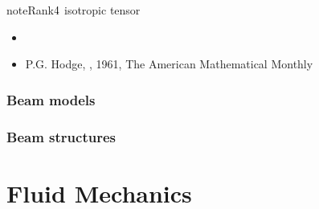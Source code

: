 \documentclass[letterpaper,10pt,english]{jupyterBook}
\begin{document}
\begin{sphinxadmonition}{note}{Rank\sphinxhyphen{}\protect\(4\protect\) isotropic tensor}
\sphinxAtStartPar
{}
\begin{itemize}
\item {} 
\sphinxAtStartPar
{}

\item {} 
\sphinxAtStartPar
P.G. Hodge, , 1961, The American Mathematical Monthly

\end{itemize}
\end{sphinxadmonition}


\section{Beam models}
\label{\detokenize{ch/solids/small-displacements-statics:beam-models}}\label{\detokenize{ch/solids/small-displacements-statics:solid-mechanics-intro-small-displacements-statics-beam}}

\section{Beam structures}
\label{\detokenize{ch/solids/small-displacements-statics:beam-structures}}\label{\detokenize{ch/solids/small-displacements-statics:solid-mechanics-intro-small-displacements-statics-beam-structures}}
\sphinxstepscope


\part{Fluid Mechanics}

\sphinxstepscope
\end{document}
